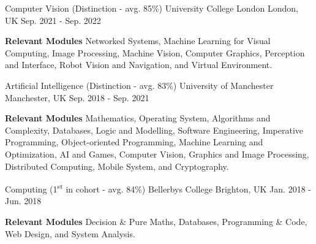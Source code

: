 

\begin{cventries}

  \eduentry
    {Computer Vision (Distinction - avg. 85\%)} %
    {University College London} %
    {London, UK} %
    {Sep. 2021 - Sep. 2022} %
    {
      \begin{cvitems} %
        \item {\textbf{Relevant Modules} Networked Systems, Machine Learning for Visual Computing, Image Processing, Machine Vision, Computer Graphics, Perception and Interface, Robot Vision and Navigation, and Virtual Environment.}
      \end{cvitems}
    }
    
  \eduentry
    {Artificial Intelligence (Distinction - avg. 83\%)} %
    {University of Manchester} %
    {Manchester, UK} %
    {Sep. 2018 - Sep. 2021} %
    {
      \begin{cvitems} %
        \item {\textbf{Relevant Modules} Mathematics, Operating System, Algorithms and Complexity, Databases, Logic and Modelling, Software Engineering, Imperative Programming, Object-oriented Programming, Machine Learning and Optimization, AI and Games,  Computer Vision, Graphics and Image Processing, Distributed Computing, Mobile System, and Cryptography.}
      \end{cvitems}
    }
    
  \eduentry
    {Computing (1\textsuperscript{st} in cohort - avg. 84\%)} %
    {Bellerbys College} %
    {Brighton, UK} %
    {Jan. 2018 - Jun. 2018} %
    {
     \begin{cvitems} %
        \item {\textbf{Relevant Modules} Decision \& Pure Maths, Databases, Programming \& Code, Web Design, and System Analysis.}
      \end{cvitems}
    }
    

\end{cventries}
